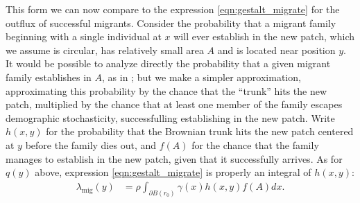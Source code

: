 \documentclass{article}
\newcommand{\E}{\mathbb{E}}
\newcommand{\migrate}{\lambda_\text{mig}}
\begin{document}
This form we can now compare to 
the expression \eqref{eqn:gestalt_migrate} for the outflux of successful migrants.
Consider the probability that a migrant family beginning with a single individual at $x$ will ever establish in the new patch,
which we assume is circular, has relatively small area $A$ and is located near position $y$.
It would be possible to analyze directly the probability that a given migrant family establishes in $A$,
as in \citet{barton1987establishment};
but we make a simpler approximation, approximating this probability by the chance that the ``trunk'' hits the new patch,
multiplied by the chance that at least one member of the family escapes demographic stochasticity,
successfulling establishing in the new patch.
Write $h(x,y)$ for the probability that the Brownian trunk
hits the new patch centered at $y$ before the family dies out,
and $f(A)$ for the chance that the family manages to establish in the new patch,
given that it successfully arrives.
As for $q(y)$ above, expression \eqref{eqn:gestalt_migrate} is properly an integral of $h(x,y)$:
\begin{align}\label{eqn:migrate_integral}
  \migrate(y) &= \rho \int_{\partial B(r_0)} \gamma(x) h(x,y) f(A) dx .
\end{align}
\end{document}
